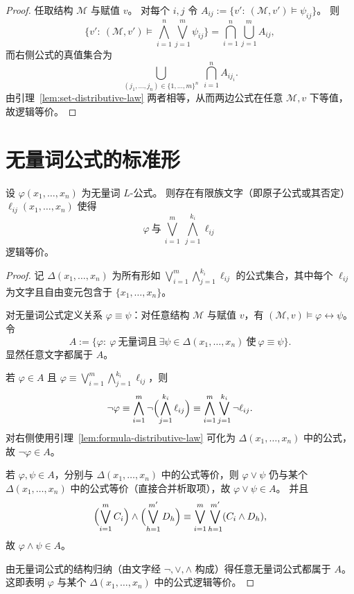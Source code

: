 \documentclass[lang=cn,a4paper,newtx,section]{elegantbook}
\begin{document}
\begin{proof}
任取结构 $\mathcal M$ 与赋值 $v$。
对每个 $i,j$ 令 $A_{ij}:=\{v':\ (\mathcal M,v')\models\psi_{ij}\}$。
则
\[
  \{v':\ (\mathcal M,v')\models\bigwedge_{i=1}^n\bigvee_{j=1}^m\psi_{ij}\}
  =
  \bigcap_{i=1}^n\bigcup_{j=1}^m A_{ij},
\]
而右侧公式的真值集合为
\[
  \bigcup_{(j_1,\dots,j_n)\in\{1,\dots,m\}^n}\ \bigcap_{i=1}^n A_{i j_i}.
\]
由引理~\ref{lem:set-distributive-law} 两者相等，从而两边公式在任意 $\mathcal M,v$ 下等值，故逻辑等价。
\end{proof}

\section{无量词公式的标准形}

\begin{lemma}[无量词公式的析取范式]
\label{quantifier-free-dnf}
设 $\varphi(x_1,\dots,x_n)$ 为无量词 $L$-公式。
则存在有限族文字（即原子公式或其否定）$\ell_{ij}(x_1,\dots,x_n)$ 使得
\[
  \varphi\ \text{与}\ \bigvee_{i=1}^m\ \bigwedge_{j=1}^{k_i}\ell_{ij}
\]
逻辑等价。
\end{lemma}

\begin{proof}
记 $\Delta(x_1,\dots,x_n)$ 为所有形如 $\bigvee_{i=1}^m\bigwedge_{j=1}^{k_i}\ell_{ij}$ 的公式集合，其中每个 $\ell_{ij}$ 为文字且自由变元包含于 $\{x_1,\dots,x_n\}$。

对无量词公式定义关系 $\varphi\equiv\psi$：对任意结构 $\mathcal M$ 与赋值 $v$，有
$(\mathcal M,v)\models\varphi\leftrightarrow\psi$。
令
\[
  A:=\{\varphi:\ \varphi\ \text{无量词且}\ \exists\psi\in\Delta(x_1,\dots,x_n)\ \text{使}\ \varphi\equiv\psi\}.
\]
显然任意文字都属于 $A$。

若 $\varphi\in A$ 且 $\varphi\equiv\bigvee_{i=1}^m\bigwedge_{j=1}^{k_i}\ell_{ij}$，则
\[
  \neg\varphi\equiv\bigwedge_{i=1}^m\neg\Bigl(\bigwedge_{j=1}^{k_i}\ell_{ij}\Bigr)
  \equiv\bigwedge_{i=1}^m\bigvee_{j=1}^{k_i}\neg\ell_{ij}.
\]
对右侧使用引理~\ref{lem:formula-distributive-law} 可化为 $\Delta(x_1,\dots,x_n)$ 中的公式，故 $\neg\varphi\in A$。

若 $\varphi,\psi\in A$，分别与 $\Delta(x_1,\dots,x_n)$ 中的公式等价，则 $\varphi\vee\psi$ 仍与某个 $\Delta(x_1,\dots,x_n)$ 中的公式等价（直接合并析取项），故 $\varphi\vee\psi\in A$。
并且
\[
  \Bigl(\bigvee_{i=1}^m C_i\Bigr)\wedge\Bigl(\bigvee_{h=1}^{m'} D_h\Bigr)
  \equiv\bigvee_{i=1}^m\bigvee_{h=1}^{m'}(C_i\wedge D_h),
\]
故 $\varphi\wedge\psi\in A$。

由无量词公式的结构归纳（由文字经 $\neg,\vee,\wedge$ 构成）得任意无量词公式都属于 $A$。
这即表明 $\varphi$ 与某个 $\Delta(x_1,\dots,x_n)$ 中的公式逻辑等价。
\end{proof}
\end{document}
